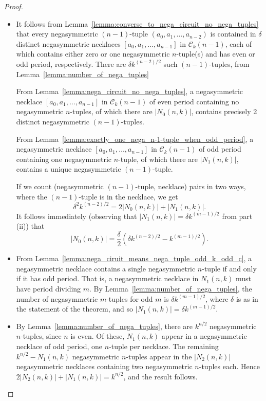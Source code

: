 \documentclass[a4paper,11pt]{article}
\theoremstyle{plain}
\theoremstyle{definition}
\theoremstyle{remark}
\begin{document}
\begin{proof}
\begin{itemize}
\item[(i)]

It follows from Lemma~\ref{lemma:converse_to_nega_circuit_no_nega_tuples} that every
negasymmetric $(n-1)$-tuple $(a_0,a_1,\dots,a_{n-2})$ is contained in $\delta$ distinct
negasymmetric necklaces $[a_0,a_1,\dots,a_{n-1}]$ in $\mathcal{C}_k(n-1)$, each of which
contains either zero or one negasymmetric $n$-tuple(s) and has even or odd period,
respectively. There are $\delta k^{(n-2)/2}$ such $(n-1)$-tuples, from
Lemma~\ref{lemma:number_of_nega_tuples}

From Lemma~\ref{lemma:nega_circuit_no_nega_tuples}, a negasymmetric necklace
$[a_0,a_1,\dots,a_{n-1}]$ in $\mathcal{C}_k(n-1)$ of even period containing no negasymmetric
$n$-tuples, of which there are $|N_0(n,k)|$, contains precisely 2 distinct negasymmetric
$(n-1)$-tuples.

From Lemma~\ref{lemma:exactly_one_nega_n-1-tuple_when_odd_period}, a negasymmetric necklace
$[a_0,a_1,\dots,a_{n-1}]$ in $\mathcal{C}_k(n-1)$ of odd period containing one negasymmetric
$n$-tuple, of which there are $|N_1(n,k)|$, contains a unique negasymmetric $(n-1)$-tuple.

If we count (negasymmetric $(n-1)$-tuple, necklace) pairs in two ways, where the $(n-1)$-tuple
is in the necklace, we get
\[ \delta^2 k^{(n-2)/2} = 2|N_0(n,k)| + |N_1(n,k)|. \]
It follows immediately (observing that $|N_1(n,k)|=\delta k^{(m-1)/2}$ from part (ii)) that
\[ |N_0(n,k)| = \frac{\delta}{2}(\delta k^{(n-2)/2}-k^{(m-1)/2}).  \]

\item[(ii)] From Lemma~\ref{lemma:nega_ciruit_means_nega_tuple_odd_k_odd_c}, a negasymmetric
    necklace contains a single negasymmetric $n$-tuple if and only if it has odd period.  That
    is, a negasymmetric necklace in $N_1(n,k)$ must have period dividing $m$. By
    Lemma~\ref{lemma:number_of_nega_tuples}, the number of negasymmetric $m$-tuples for odd $m$
    is $\delta k^{(m-1)/2}$, where $\delta$ is as in the statement of the theorem, and so
    $|N_1(n,k)| = \delta k^{(m-1)/2}$.
\item[(iii)] By Lemma~\ref{lemma:number_of_nega_tuples}, there are $k^{n/2}$ negasymmetric
    $n$-tuples, since $n$ is even.  Of these, $N_1(n,k)$ appear in a negasymmetric necklace of
    odd period, one $n$-tuple per necklace. The remaining $k^{n/2}-N_1(n,k)$ negasymmetric
    $n$-tuples appear in the $|N_2(n,k)|$ negasymmetric necklaces containing two negasymmetric
    $n$-tuples each.  Hence $2|N_2(n,k)|+|N_1(n,k)|=k^{n/2}$, and the result follows.
\end{itemize}
\end{proof}
\end{document}
